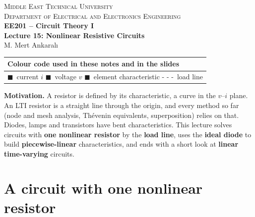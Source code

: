 \documentclass[11pt,a4paper]{article}
\newcommand{\Icol}[1]{\textcolor{ccur}{#1}}
\newcommand{\Vcol}[1]{\textcolor{cvolt}{#1}}
\begin{document}
\begin{center}
\begin{tcolorbox}[enhanced, colback=metured!5, colframe=metured, boxrule=1pt,
                  arc=3pt, left=10pt,right=10pt,top=7pt,bottom=7pt, width=\textwidth]
\begin{center}
  {\small\scshape Middle East Technical University}\\[2pt]
  {\small\scshape Department of Electrical and Electronics Engineering}\\[7pt]
  {\Large\bfseries\color{metured} EE201 -- Circuit Theory I}\\[4pt]
  {\large\bfseries Lecture 15: Nonlinear Resistive Circuits}\\[6pt]
  {\small M. Mert Ankaral{\i}}
\end{center}
\end{tcolorbox}
\end{center}
\vspace{-0.5em}

\begin{center}
\small
\begin{tabular}{@{}l@{}}
\toprule
\textbf{Colour code used in these notes and in the slides}\\
\midrule
\Icol{$\blacksquare$}~current $i$ \quad
\Vcol{$\blacksquare$}~voltage $v$ \quad
\textcolor{metured}{$\blacksquare$}~element characteristic \quad
\Icol{- - -}~load line\\
\bottomrule
\end{tabular}
\end{center}

\textbf{Motivation.} A resistor is defined by its characteristic, a curve in the
$v$--$i$ plane. An LTI resistor is a straight line through the origin, and every method so far
(node and mesh analysis, Th\'evenin equivalents, superposition) relies on that. Diodes, lamps
and transistors have bent characteristics. This lecture solves circuits with \textbf{one
nonlinear resistor} by the \textbf{load line}, uses the \textbf{ideal diode} to build
\textbf{piecewise-linear} characteristics, and ends with a short look at \textbf{linear
time-varying} circuits.

\section{A circuit with one nonlinear resistor}
\end{document}
